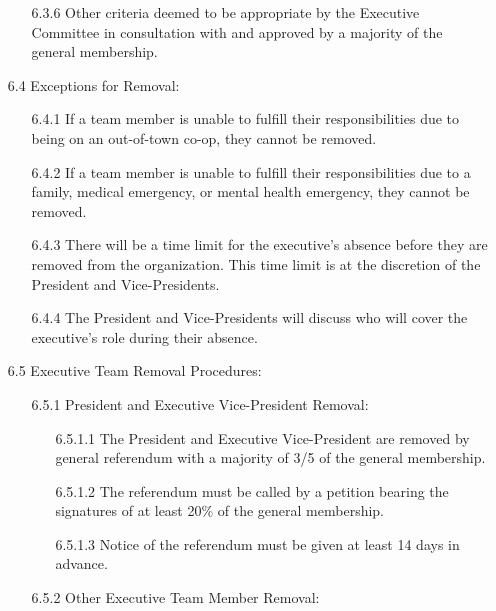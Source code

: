 \documentclass[12pt,a4paper]{article}
\begin{document}
\begin{enumerate}
\begin{enumerate}
\item[6.3.6] Other criteria deemed to be appropriate by the Executive Committee in consultation with and approved by a majority of the general membership.
\end{enumerate}

\item[6.4] Exceptions for Removal:

\begin{enumerate}
\item[6.4.1] If a team member is unable to fulfill their responsibilities due to being on an out-of-town co-op, they cannot be removed.

\item[6.4.2] If a team member is unable to fulfill their responsibilities due to a family, medical emergency, or mental health emergency, they cannot be removed.

\item[6.4.3] There will be a time limit for the executive's absence before they are removed from the organization. This time limit is at the discretion of the President and Vice-Presidents.

\item[6.4.4] The President and Vice-Presidents will discuss who will cover the executive's role during their absence.
\end{enumerate}

\item[6.5] Executive Team Removal Procedures:

\begin{enumerate}
\item[6.5.1] President and Executive Vice-President Removal:

\begin{enumerate}
\item[6.5.1.1] The President and Executive Vice-President are removed by general referendum with a majority of 3/5 of the general membership.

\item[6.5.1.2] The referendum must be called by a petition bearing the signatures of at least 20\% of the general membership.

\item[6.5.1.3] Notice of the referendum must be given at least 14 days in advance.
\end{enumerate}

\item[6.5.2] Other Executive Team Member Removal:


\end{enumerate}
\end{enumerate}
\end{document}
